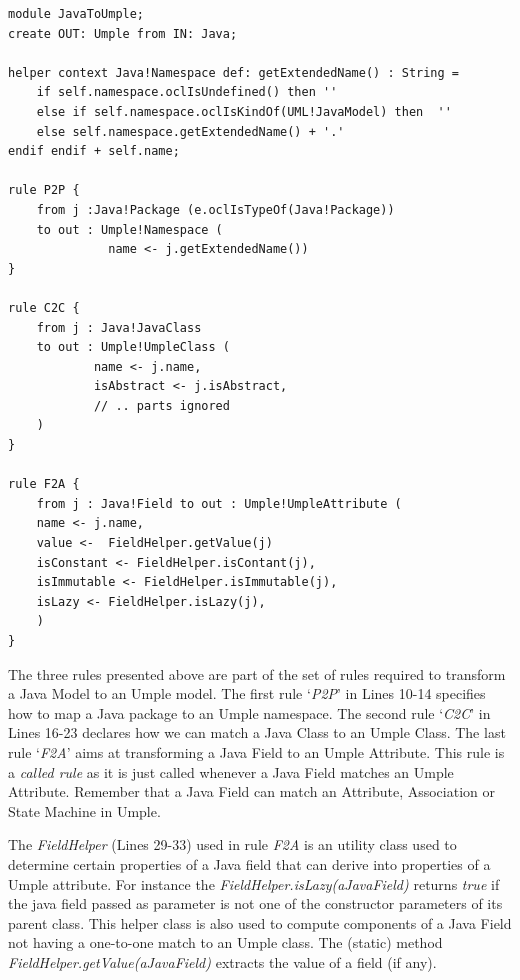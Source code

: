 \begin{lstlisting}[style=atl, label=lst:atlrules, caption=ATL Transformations rules]
module JavaToUmple;
create OUT: Umple from IN: Java;

helper context Java!Namespace def: getExtendedName() : String = 
	if self.namespace.oclIsUndefined() then '' 	
	else if self.namespace.oclIsKindOf(UML!JavaModel) then 	'' 
	else self.namespace.getExtendedName() + '.'
endif endif + self.name;

rule P2P { 
	from j :Java!Package (e.oclIsTypeOf(Java!Package)) 	
	to out : Umple!Namespace ( 		
			  name <- j.getExtendedName())
}

rule C2C { 	
	from j : Java!JavaClass 	
	to out : Umple!UmpleClass ( 	
			name <- j.name, 	
			isAbstract <- j.isAbstract,      
			// .. parts ignored		
	)
}

rule F2A { 	
	from j : Java!Field to out : Umple!UmpleAttribute ( 		
	name <- j.name,
	value <-  FieldHelper.getValue(j) 	
	isConstant <- FieldHelper.isContant(j), 		
	isImmutable <- FieldHelper.isImmutable(j), 		
	isLazy <- FieldHelper.isLazy(j),
	)
}

\end{lstlisting}


The three rules presented above are part of the set of rules required to transform a Java Model to an Umple model.  The first rule `\textit{P2P}' in Lines 10-14  specifies how to map a Java package to an Umple namespace. The second rule `\textit{C2C}' in Lines 16-23 declares how we can match a Java Class to an Umple Class. The last rule `\textit{F2A}' aims at transforming a Java Field to an Umple Attribute. This rule is a \textit{called rule} as it is just called whenever a Java Field matches an Umple Attribute. Remember that a Java Field can match an Attribute, Association or State Machine in Umple.

The \textit{FieldHelper} (Lines 29-33) used in rule \textit{F2A} is an utility class used to determine certain properties of a Java field that can derive into properties of a Umple attribute. For instance the \textit{FieldHelper.isLazy(aJavaField)} returns \textit{true} if the java field passed as parameter is not one of the constructor parameters of its parent class. This helper class is also used to compute components of a Java Field not having a one-to-one match to an Umple class. The (static) method \textit{FieldHelper.getValue(aJavaField)} extracts the value of a field (if any). 

